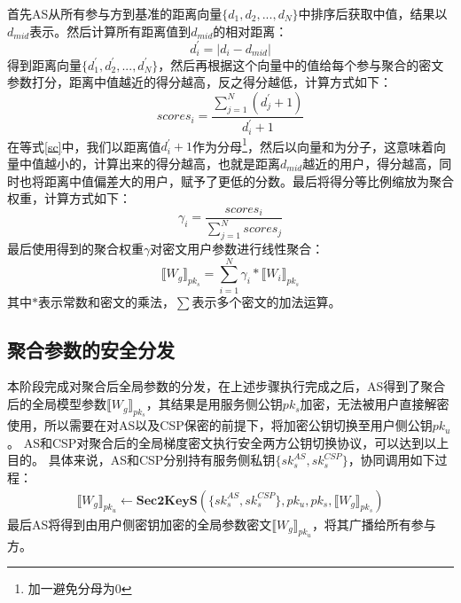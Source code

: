 首先AS从所有参与方到基准的距离向量$\{d_1, d_2,...,d_N\}$中排序后获取中值，结果以$d_{mid}$表示。然后计算所有距离值到$ d_{mid} $的相对距离：
\begin{equation}\label{dToMid}
	d^{\prime}_{i}=\left|d_i-d_{mid}\right|
\end{equation}
得到距离向量$\{d^{\prime}_1, d^{\prime}_2,...,d^{\prime}_N\}$，然后再根据这个向量中的值给每个参与聚合的密文参数打分，距离中值越近的得分越高，反之得分越低，计算方式如下：
\begin{equation}\label{sc}
	scores_i=\frac{\sum_{j=1}^{N} (d^{\prime}_{j} + 1)}{d^{\prime}_i + 1}
\end{equation}
在等式\ref{sc}中，我们以距离值$d^{\prime}_i + 1$作为分母\footnote{加一避免分母为0}，然后以向量和为分子，这意味着向量中值越小的，计算出来的得分越高，也就是距离$d_{mid}$越近的用户，得分越高，同时也将距离中值偏差大的用户，赋予了更低的分数。最后将得分等比例缩放为聚合权重，计算方式如下：
\begin{equation}
	\gamma_i=\dfrac{scores_i}{\sum_{j=1}^{N} scores_j}
\end{equation}
最后使用得到的聚合权重$\gamma$对密文用户参数进行线性聚合：
\begin{equation}\label{e3}
	\llbracket W_g\rrbracket_{pk_s}=\sum_{i=1}^{N}\gamma_i*\llbracket W_i\rrbracket_{pk_s}
\end{equation}
其中$*$表示常数和密文的乘法，$\sum$表示多个密文的加法运算。

\subsection{聚合参数的安全分发}
本阶段完成对聚合后全局参数的分发，在上述步骤执行完成之后，AS得到了聚合后的全局模型参数$ \llbracket W_g\rrbracket_{pk_s} $，其结果是用服务侧公钥$pk_s$加密，无法被用户直接解密使用，所以需要在对AS以及CSP保密的前提下，将加密公钥切换至用户侧公钥$pk_u$。
AS和CSP对聚合后的全局梯度密文执行安全两方公钥切换协议，可以达到以上目的。
具体来说，AS和CSP分别持有服务侧私钥$\{sk_s^{AS}, sk_s^{CSP}\}$，协同调用如下过程：
	\begin{equation}\label{e4}
		\begin{aligned}
			\llbracket W_g\rrbracket_{pk_u} \leftarrow \textbf{Sec2KeyS}(\{sk_s^{AS}, sk_s^{CSP}\}, pk_u, pk_s, \llbracket W_g\rrbracket_{pk_s})
		\end{aligned}
	\end{equation}
最后AS将得到由用户侧密钥加密的全局参数密文$\llbracket W_g\rrbracket_{pk_u}$，将其广播给所有参与方。

